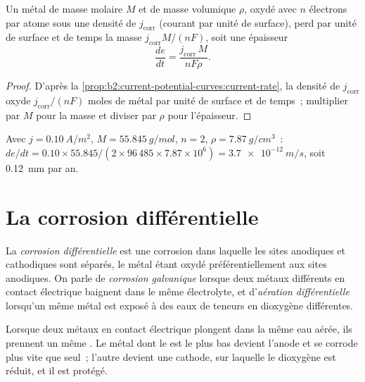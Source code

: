 \begin{proposition}\label{prop:b2:corrosion:rate}
Un métal de masse molaire $M$ et de masse volumique $\rho$, oxydé avec $n$ électrons par
atome sous une densité de  $j_{\text{corr}}$ (courant par unité de surface),
perd par unité de surface et de temps la masse $j_{\text{corr}}M/(nF)$, soit une
épaisseur
\[
  \frac{de}{dt} = \frac{j_{\text{corr}}\,M}{nF\rho} .
\]
\end{proposition}

\begin{proof}
D'après la \cref{prop:b2:current-potential-curves:current-rate}, la densité de  $j_{\text{corr}}$ oxyde $j_{\text{corr}}/(nF)$ moles de métal par unité de surface et de
temps~; multiplier par $M$ pour la masse et diviser par $\rho$ pour l'épaisseur.
\end{proof}

\begin{example}\label{ex:b2:corrosion:rate}
Avec $j = \qty{0.10}{A/m^2}$, $M = \qty{55.845}{g/mol}$, $n = 2$, $\rho =
\qty{7.87}{g/cm^3}$~: $de/dt = 0.10 \times 55.845/(2 \times 96\,485 \times 7.87
\times 10^6) = \qty{3.7e-12}{m/s}$, soit \qty{0.12}{mm} par an.
\end{example}

\section{La corrosion différentielle}

\begin{definition}\label{def:b2:corrosion:differential}
La \emph{corrosion différentielle} est une corrosion dans
laquelle les sites anodiques et cathodiques sont séparés, le métal étant
oxydé préférentiellement aux sites anodiques. On parle de \emph{corrosion
galvanique} lorsque deux métaux différents en contact électrique
baignent dans le même électrolyte, et d'\emph{aération
différentielle} lorsqu'un même métal est exposé à des eaux de
teneurs en dioxygène différentes.
\end{definition}

\begin{proposition}\label{prop:b2:corrosion:galvanic}
Lorsque deux métaux en contact électrique plongent dans la même eau aérée, ils
prennent un même . Le métal dont le  est le plus bas
devient l'anode et se corrode plus vite que seul~; l'autre devient une cathode,
sur laquelle le dioxygène est réduit, et il est protégé.
\end{proposition}

